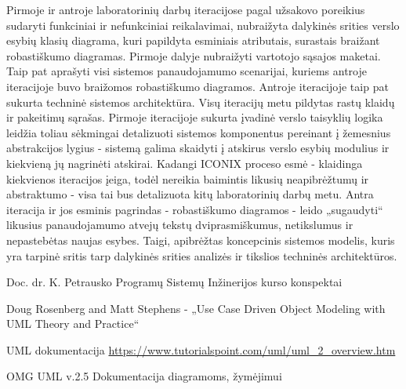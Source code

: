 \documentclass{VUMIFPSkursinis}
\begin{document}
Pirmoje ir antroje laboratorinių darbų iteracijose pagal užsakovo poreikius sudaryti funkciniai ir nefunkciniai reikalavimai, nubraižyta dalykinės srities verslo esybių klasių diagrama, kuri papildyta esminiais atributais, surastais braižant robastiškumo diagramas. Pirmoje dalyje nubraižyti vartotojo sąsajos maketai. Taip pat aprašyti visi sistemos panaudojamumo scenarijai, kuriems antroje iteracijoje buvo braižomos robastiškumo diagramos. Antroje iteracijoje taip pat sukurta techninė sistemos architektūra. Visų iteracijų metu pildytas rastų klaidų ir pakeitimų sąrašas.
Pirmoje iteracijoje sukurta įvadinė verslo taisyklių logika leidžia toliau sėkmingai detalizuoti sistemos komponentus pereinant į žemesnius abstrakcijos lygius - sistemą galima skaidyti į atskirus verslo esybių modulius ir kiekvieną jų nagrinėti atskirai. Kadangi ICONIX proceso esmė - klaidinga kiekvienos iteracijos įeiga, todėl nereikia baimintis likusių neapibrėžtumų ir abstraktumo - visa tai bus detalizuota kitų laboratorinių darbų metu. Antra iteracija ir jos esminis pagrindas - robastiškumo diagramos - leido „sugaudyti“ likusius panaudojamumo atvejų tekstų dviprasmiškumus, netikslumus ir nepastebėtas naujas esybes. Taigi, apibrėžtas koncepcinis sistemos modelis, kuris yra tarpinė sritis tarp dalykinės srities analizės ir tikslios techninės architektūros.


\begin{enumerate}[label={[\arabic*]},itemsep=-2mm]
	\item Doc. dr. K. Petrausko Programų Sistemų Inžinerijos kurso konspektai
	\label{petrauskas}
	\item Doug Rosenberg and Matt Stephens - „Use Case Driven Object Modeling with UML Theory and Practice“
	\label{iconix}
	\item UML dokumentacija \url{https://www.tutorialspoint.com/uml/uml_2_overview.htm}
	\label{uml}
	\item OMG UML v.2.5 Dokumentacija diagramoms, žymėjimui
	\label{omguml}
\end{enumerate}
\end{document}
